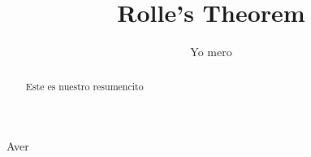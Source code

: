 \documentclass{article}
\title{Rolle's Theorem}
\author{Yo mero}
\date{}
\begin{document}
    \maketitle

    \begin{abstract}
        Este es nuestro resumencito
    \end{abstract}
    Aver
\end{document}
